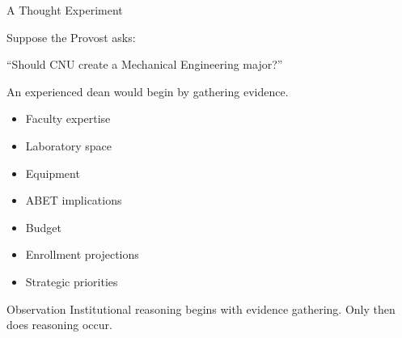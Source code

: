 \documentclass[aspectratio=169]{beamer}
\begin{document}

\begin{frame}{A Thought Experiment}

Suppose the Provost asks:

\vspace{0.3cm}

\Large

\centering

``Should CNU create a Mechanical Engineering major?''

\normalsize

\vspace{0.5cm}

An experienced dean would begin by gathering evidence.

\begin{itemize}
\item Faculty expertise
\item Laboratory space
\item Equipment
\item ABET implications
\item Budget
\item Enrollment projections
\item Strategic priorities
\end{itemize}

\vspace{0.3cm}

\begin{block}{Observation}
Institutional reasoning begins with evidence gathering.
Only then does reasoning occur.
\end{block}

\end{frame}

\end{document}
